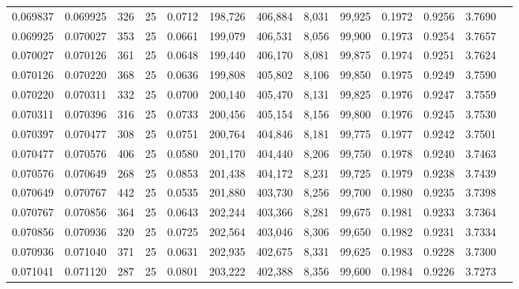 \begin{tabular}{rrrrrrrrrrrrr}
0.069837 & 0.069925 &   326 &  25 &                                     0.0712 & 198,726 & 406,884 &   8,031 &  99,925 & 0.1972 & 0.9256 & 3.7690 \\
0.069925 & 0.070027 &   353 &  25 &                                     0.0661 & 199,079 & 406,531 &   8,056 &  99,900 & 0.1973 & 0.9254 & 3.7657 \\
0.070027 & 0.070126 &   361 &  25 &                                     0.0648 & 199,440 & 406,170 &   8,081 &  99,875 & 0.1974 & 0.9251 & 3.7624 \\
0.070126 & 0.070220 &   368 &  25 &                                     0.0636 & 199,808 & 405,802 &   8,106 &  99,850 & 0.1975 & 0.9249 & 3.7590 \\
0.070220 & 0.070311 &   332 &  25 &                                     0.0700 & 200,140 & 405,470 &   8,131 &  99,825 & 0.1976 & 0.9247 & 3.7559 \\
0.070311 & 0.070396 &   316 &  25 &                                     0.0733 & 200,456 & 405,154 &   8,156 &  99,800 & 0.1976 & 0.9245 & 3.7530 \\
0.070397 & 0.070477 &   308 &  25 &                                     0.0751 & 200,764 & 404,846 &   8,181 &  99,775 & 0.1977 & 0.9242 & 3.7501 \\
0.070477 & 0.070576 &   406 &  25 &                                     0.0580 & 201,170 & 404,440 &   8,206 &  99,750 & 0.1978 & 0.9240 & 3.7463 \\
0.070576 & 0.070649 &   268 &  25 &                                     0.0853 & 201,438 & 404,172 &   8,231 &  99,725 & 0.1979 & 0.9238 & 3.7439 \\
0.070649 & 0.070767 &   442 &  25 &                                     0.0535 & 201,880 & 403,730 &   8,256 &  99,700 & 0.1980 & 0.9235 & 3.7398 \\
0.070767 & 0.070856 &   364 &  25 &                                     0.0643 & 202,244 & 403,366 &   8,281 &  99,675 & 0.1981 & 0.9233 & 3.7364 \\
0.070856 & 0.070936 &   320 &  25 &                                     0.0725 & 202,564 & 403,046 &   8,306 &  99,650 & 0.1982 & 0.9231 & 3.7334 \\
0.070936 & 0.071040 &   371 &  25 &                                     0.0631 & 202,935 & 402,675 &   8,331 &  99,625 & 0.1983 & 0.9228 & 3.7300 \\
0.071041 & 0.071120 &   287 &  25 &                                     0.0801 & 203,222 & 402,388 &   8,356 &  99,600 & 0.1984 & 0.9226 & 3.7273 \\

\end{tabular}
